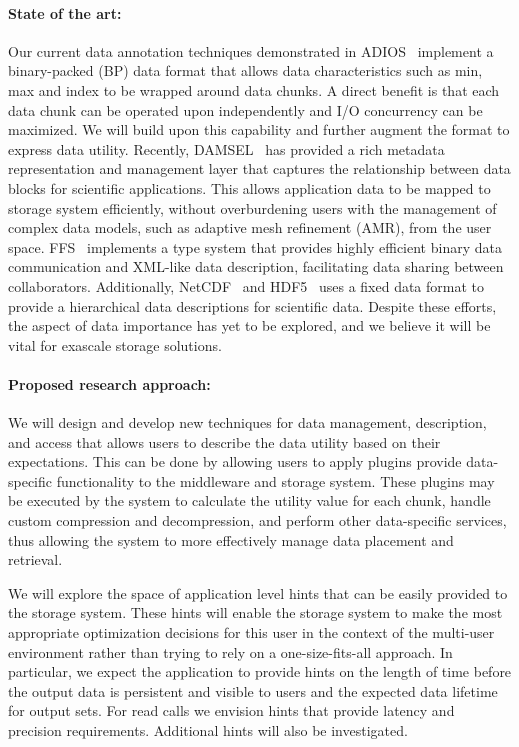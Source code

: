 \paragraph{State of the art:}
Our current data annotation techniques demonstrated in
ADIOS~\cite{lofstead:2009:adaptible} implement a binary-packed (BP) data format that
allows data characteristics such as min, max and index to be wrapped around
data chunks. A direct benefit is that each data chunk can be operated upon
independently and I/O concurrency can be maximized. We will build upon this
capability and further augment the format to express data utility.
Recently,
DAMSEL~\cite{damsel} has provided a rich metadata representation and management
layer that captures the relationship between data blocks for scientific
applications.  This allows application data to be mapped to storage system
efficiently, without overburdening users with the management of complex data models, such
as adaptive mesh refinement (AMR), from the user space. 
FFS~\cite{ffs} implements a type system that provides highly efficient binary
data communication and XML-like data description, facilitating data sharing
between collaborators. Additionally, NetCDF~\cite{netcdf} and HDF5~\cite{hdf5}
uses a fixed data format to provide a hierarchical data descriptions for scientific data.
Despite these efforts, the aspect of data importance has yet to be 
explored, and we believe it will be vital for exascale storage solutions.

\paragraph{Proposed research approach:} 
We will design and develop new techniques for data management, description,
and access that allows users to describe the data utility based on their
expectations. This can be done by allowing users to apply plugins
provide data-specific functionality to the middleware and storage system.
These plugins may be executed by the system to
calculate the utility value for each chunk, handle custom compression
and decompression, and perform other data-specific services, thus allowing
the system to more effectively manage data placement and retrieval.
%

We will explore the space of application level hints that can be easily provided
to the storage system. These hints will enable the storage system to make the
most appropriate optimization decisions for this user in the context of the
multi-user environment rather than trying to rely on a one-size-fits-all
approach. In particular, we expect the application to provide hints on the
length of time before the output data is persistent and visible to users and
the expected data lifetime for output sets. For read calls we envision
hints that provide latency and precision requirements. Additional hints will
also be investigated.

